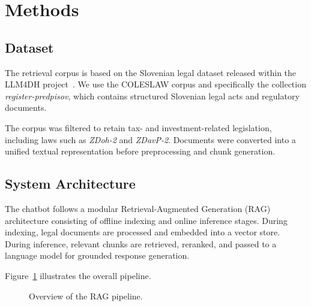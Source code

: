 \documentclass[fleqn,moreauthors,10pt]{ds_report}
\begin{document}
\newpage
\section*{Methods}

\subsection*{Dataset}

The retrieval corpus is based on the Slovenian legal dataset released within the LLM4DH project~\cite{llm4dh}. We use the COLESLAW corpus and specifically the collection \emph{register-predpisov}, which contains structured Slovenian legal acts and regulatory documents.

The corpus was filtered to retain tax- and investment-related legislation, including laws such as \textit{ZDoh-2} and \textit{ZDavP-2}. Documents were converted into a unified textual representation before preprocessing and chunk generation.



\subsection*{System Architecture}

The chatbot follows a modular Retrieval-Augmented Generation (RAG) architecture consisting of offline indexing and online inference stages. During indexing, legal documents are processed and embedded into a vector store. During inference, relevant chunks are retrieved, reranked, and passed to a language model for grounded response generation.

Figure~\ref{fig:pipeline} illustrates the overall pipeline.


\begin{figure}[h]
  \centering
  \caption{Overview of the RAG pipeline.}
  \label{fig:pipeline}
\end{figure}
\end{document}
